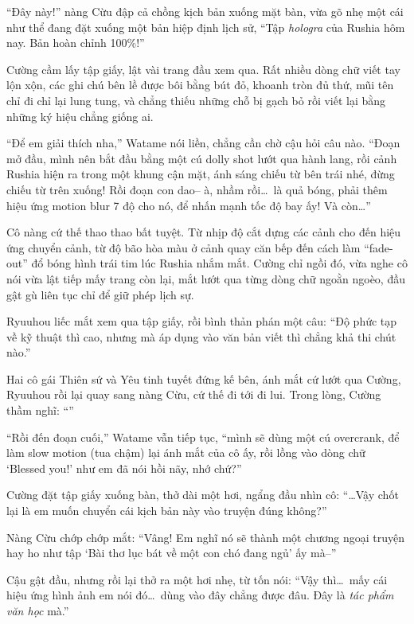 \documentclass[../main.tex]{subfiles}
\begin{document}
``Đây này!'' nàng Cừu đập cả chồng kịch bản xuống mặt bàn, vừa gõ nhẹ một cái như thể đang đặt xuống một bản hiệp định lịch sử, ``Tập \textit{hologra} của Rushia hôm nay. Bản hoàn chỉnh 100\%!''

Cường cầm lấy tập giấy, lật vài trang đầu xem qua. Rất nhiều dòng chữ viết tay lộn xộn, các ghi chú bên lề được bôi bằng bút đỏ, khoanh tròn đủ thứ, mũi tên chỉ đi chỉ lại lung tung, và chẳng thiếu những chỗ bị gạch bỏ rồi viết lại bằng những ký hiệu chẳng giống ai.

``Để em giải thích nha,'' Watame nói liền, chẳng cần chờ cậu hỏi câu nào. ``Đoạn mở đầu, mình nên bắt đầu bằng một cú dolly shot lướt qua hành lang, rồi cảnh Rushia hiện ra trong một khung cận mặt, ánh sáng chiếu từ bên trái nhé, đừng chiếu từ trên xuống! Rồi đoạn con dao-- à, nhầm rồi\dots\ là quả bóng, phải thêm hiệu ứng motion blur 7 độ cho nó, để nhấn mạnh tốc độ bay ấy! Và còn\dots''

Cô nàng cứ thế thao thao bất tuyệt. Từ nhịp độ cắt dựng các cảnh cho đến hiệu ứng chuyển cảnh, từ độ bão hòa màu ở cảnh quay căn bếp đến cách làm ``fade-out'' đổ bóng hình trái tim lúc Rushia nhắm mắt. Cường chỉ ngồi đó, vừa nghe cô nói vừa lật tiếp mấy trang còn lại, mắt lướt qua từng dòng chữ ngoằn ngoèo, đầu gật gù liên tục chỉ để giữ phép lịch sự.

Ryuuhou liếc mắt xem qua tập giấy, rồi bình thản phán một câu: ``Độ phức tạp về kỹ thuật thì cao, nhưng mà áp dụng vào văn bản viết thì chẳng khả thi chút nào.''

Hai cô gái Thiên sứ và Yêu tinh tuyết đứng kế bên, ánh mắt cứ lướt qua Cường, Ryuuhou rồi lại quay sang nàng Cừu, cứ thế đi tới đi lui. Trong lòng, Cường thầm nghĩ: ``''

``Rồi đến đoạn cuối,'' Watame vẫn tiếp tục, ``mình sẽ dùng một cú overcrank, để làm slow motion (tua chậm) lại ánh mắt của cô ấy, rồi lồng vào dòng chữ `Blessed you!' như em đã nói hồi nãy, nhớ chứ?''

Cường đặt tập giấy xuống bàn, thở dài một hơi, ngẩng đầu nhìn cô: ``\dots Vậy chốt lại là em muốn chuyển cái kịch bản này vào truyện đúng không?''

Nàng Cừu chớp chớp mắt: ``Vâng! Em nghĩ nó sẽ thành một chương ngoại truyện hay ho như tập `Bài thơ lục bát về một con chó đang ngủ' ấy mà--''

Cậu gật đầu, nhưng rồi lại thở ra một hơi nhẹ, từ tốn nói: ``Vậy thì\dots\ mấy cái hiệu ứng hình ảnh em nói đó\dots\ dùng vào đây chẳng được đâu. Đây là \emph{tác phẩm văn học} mà.''
\end{document}
